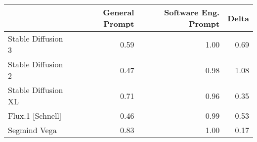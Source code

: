 \begin{tabular}{lrrr}
\toprule
 & General Prompt & Software Eng. Prompt & Delta \\
\midrule
Stable Diffusion 3 & 0.59 & 1.00 & 0.69 \\
Stable Diffusion 2 & 0.47 & 0.98 & 1.08 \\
Stable Diffusion XL & 0.71 & 0.96 & 0.35 \\
Flux.1 [Schnell] & 0.46 & 0.99 & 0.53 \\
Segmind Vega & 0.83 & 1.00 & 0.17 \\
\bottomrule
\end{tabular}
